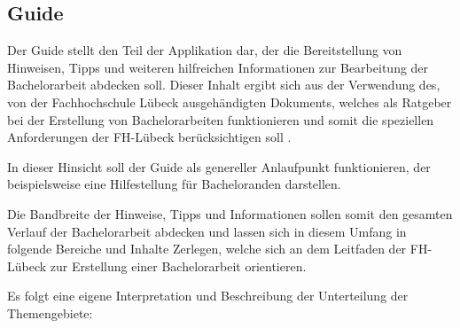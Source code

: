 \documentclass{scrreprt}
\begin{document}
\par \medskip


\newpage
\subsection{Guide}
\par Der Guide stellt den Teil der Applikation dar, der die Bereitstellung von Hinweisen, Tipps und weiteren hilfreichen Informationen zur Bearbeitung der Bachelorarbeit abdecken soll. Dieser Inhalt ergibt sich aus der Verwendung des, von der Fachhochschule Lübeck ausgehändigten Dokuments, welches als Ratgeber bei der Erstellung von Bachelorarbeiten funktionieren und somit die speziellen Anforderungen der FH-Lübeck berücksichtigen soll \citep[vgl. Kapitel 1]{FHLuebeckBAAnleitung}.
\par In dieser Hinsicht soll der Guide als genereller Anlaufpunkt funktionieren, der beispielsweise eine Hilfestellung für Bacheloranden darstellen.

\par\medskip Die Bandbreite der Hinweise, Tipps und Informationen sollen somit den gesamten Verlauf der Bachelorarbeit abdecken und lassen sich in diesem Umfang in folgende Bereiche und Inhalte Zerlegen, welche sich an dem Leitfaden der FH-Lübeck\citep{FHLuebeckBAAnleitung} zur Erstellung einer Bachelorarbeit orientieren.

\par\medskip Es folgt eine eigene Interpretation und Beschreibung der Unterteilung der Themengebiete:
\end{document}
